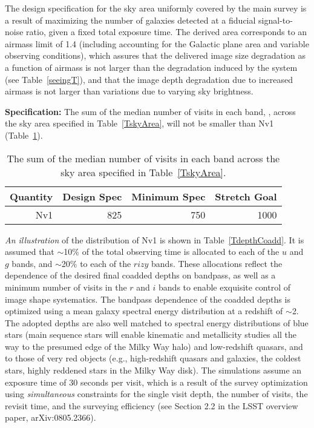 The design specification for the sky area uniformly covered by the main
survey is a result of maximizing the number of galaxies detected at a
fiducial signal-to-noise ratio, given a fixed total exposure time.
The derived area corresponds to an airmass limit of 1.4 (including
accounting for the Galactic plane area and variable observing conditions),
which assures that the delivered image size degradation as a function of
airmass is not larger than the degradation induced by the system
(see Table~\ref{seeingT}), and that the image depth degradation due to
increased airmass is not larger than variations due to varying
sky brightness.



{\bf Specification:} The sum of the median number of visits in each
band,
,
across the sky area specified in Table~\ref{TskyArea},
will not be smaller than Nv1 (Table~\ref{Nv1table}).
\begin{table}[h]
\begin{tabular}{|r|r|r|r|}
\hline
 Quantity            & Design Spec & Minimum Spec & Stretch Goal     \\
\hline
     Nv1             &   825   &   750     &    1000     \\
\hline
\end{tabular}
\caption{ The sum of the median number of visits in each
band across the sky area specified in Table~\ref{TskyArea}.}
\label{Nv1table}
\end{table}


{\it An illustration}
of the distribution of Nv1 is shown in Table~\ref{TdepthCoadd}.
It is assumed that $\sim$10\% of the total observing time is allocated to
each of the $u$ and $g$ bands, and $\sim$20\% to each of the $rizy$ bands. These allocations
reflect the dependence of the desired final coadded depths on bandpass,
as well as a minimum number of visits in the $r$ and $i$ bands to enable
exquisite control of image shape systematics. The bandpass dependence of
the coadded depths is optimized using a mean galaxy spectral energy
distribution at a redshift of $\sim$2. The adopted
depths are also well matched to spectral energy distributions of blue stars
(main sequence stars will enable kinematic and
metallicity studies all the way to the presumed edge of the Milky Way halo)
and low-redshift quasars, and to those of very red objects (e.g., high-redshift
quasars and galaxies, the coldest stars, highly reddened stars in the Milky
Way disk). The simulations assume an exposure time of 30 seconds per visit,
which is a result of the survey optimization using {\it simultaneous}
constraints for the single visit depth, the number of visits, the revisit
time, and the surveying efficiency (see Section 2.2 in the LSST overview
paper, arXiv:0805.2366).



